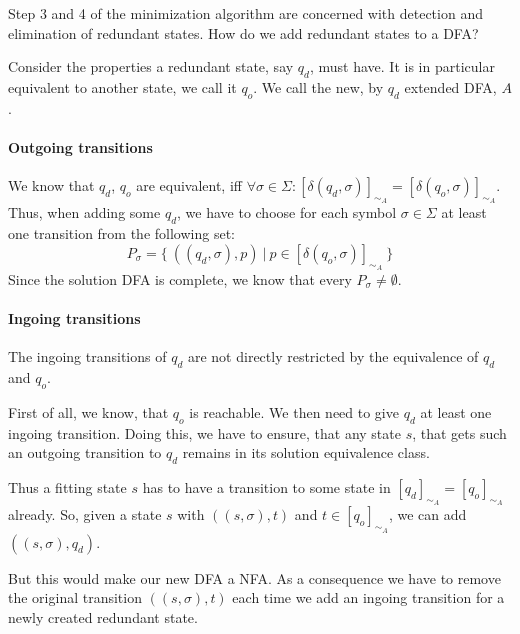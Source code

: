 Step 3 and 4 of the minimization algorithm are concerned with detection and elimination of redundant states. How do we add redundant states to a DFA?

Consider the properties a redundant state, say $q_d$, must have. It is in particular equivalent to another state, we call it $q_o$. We call the new, by $q_d$ extended DFA, $A$.


\paragraph*{Outgoing transitions}

We know that $q_d$, $q_o$ are equivalent, iff $\forall \sigma \in \Sigma \colon [\delta(q_d, \sigma)]_{\sim_A} = [\delta(q_o, \sigma)]_{\sim_A}$. Thus, when adding some $q_d$, we have to choose for each symbol $\sigma \in \Sigma$ at least one transition from the following set:
\[
	P_\sigma = \{\ ((q_d, \sigma), p)\ |\ p \in [\delta(q_o, \sigma)]_{\sim_A}\ \}
\]
Since the solution DFA is complete, we know that every $P_\sigma \neq \emptyset$.


\paragraph*{Ingoing transitions}

The ingoing transitions of $q_d$ are not directly restricted by the equivalence of $q_d$ and $q_o$.

First of all, we know, that $q_o$ is reachable. We then need to give $q_d$ at least one ingoing transition. Doing this, we have to ensure, that any state $s$, that gets such an outgoing transition to $q_d$ remains in its solution equivalence class.
	
Thus a fitting state $s$ has to have a transition to some state in $[q_d]_{\sim_A} = [q_o]_{\sim_A}$ already. So, given a state $s$ with $((s, \sigma), t)$ and $t \in [q_o]_{\sim_A}$, we can add $((s, \sigma), q_d)$.

But this would make our new DFA a NFA. As a consequence we have to remove the original transition $((s, \sigma), t)$ each time we add an ingoing transition for a newly created redundant state.

